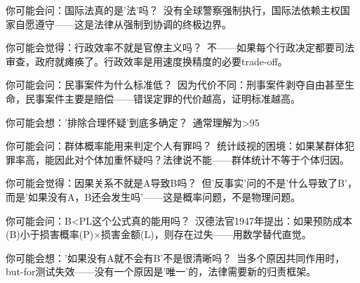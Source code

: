 \documentclass[a4paper,12pt]{book}
\newenvironment{motivation}{\begin{tcolorbox}[colback=gray!10,colframe=gray!60,title=\textit{本章动机},fonttitle=\bfseries,arc=0mm,leftrule=3mm]\small\itshape}{\end{tcolorbox}}
\begin{document}
\begin{motivation}
\begin{motivation}
\begin{motivation}
	\begin{tcolorbox}[colback=yellow!5, title=\textit{读者行为预测}]
		你可能会问：国际法真的是'法'吗？\ 没有全球警察强制执行，国际法依赖主权国家自愿遵守——这是法律从强制到协调的终极边界。
	\end{tcolorbox}


	\begin{tcolorbox}[colback=yellow!5, title=\textit{读者行为预测}]
		你可能会觉得：行政效率不就是官僚主义吗？\ 不——如果每个行政决定都要司法审查，政府就瘫痪了。行政效率是用速度换精度的必要trade-off。
	\end{tcolorbox}


	\begin{tcolorbox}[colback=yellow!5, title=\textit{读者行为预测}]
		你可能会问：民事案件为什么标准低？\ 因为代价不同：刑事案件剥夺自由甚至生命，民事案件主要是赔偿——错误定罪的代价越高，证明标准越高。
	\end{tcolorbox}


	\begin{tcolorbox}[colback=yellow!5, title=\textit{读者行为预测}]
		你可能会想：'排除合理怀疑'到底多确定？\ 通常理解为>95%
	\end{tcolorbox}


	\begin{tcolorbox}[colback=yellow!5, title=\textit{读者行为预测}]
		你可能会问：群体概率能用来判定个人有罪吗？\ 统计歧视的困境：如果某群体犯罪率高，能因此对个体加重怀疑吗？法律说不能——群体统计不等于个体归因。
	\end{tcolorbox}


	\begin{tcolorbox}[colback=yellow!5, title=\textit{读者行为预测}]
		你可能会觉得：因果关系不就是A导致B吗？\ 但'反事实'问的不是'什么导致了B'，而是'如果没有A，B还会发生吗'——这是概率问题，不是物理问题。
	\end{tcolorbox}


	\begin{tcolorbox}[colback=yellow!5, title=\textit{读者行为预测}]
		你可能会问：B<PL这个公式真的能用吗？\ 汉德法官1947年提出：如果预防成本(B)小于损害概率(P)×损害金额(L)，则存在过失——用数学替代直觉。
	\end{tcolorbox}


	\begin{tcolorbox}[colback=yellow!5, title=\textit{读者行为预测}]
		你可能会想：'如果没有A就不会有B'不是很清晰吗？\ 当多个原因共同作用时，but-for测试失效——没有一个原因是'唯一'的，法律需要新的归责框架。
	\end{tcolorbox}



\end{motivation}
\end{motivation}
\end{motivation}
\end{document}
